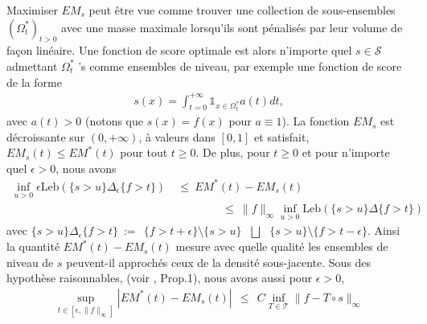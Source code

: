 \documentclass[a4paper, 12pt]{article}
\def\S{\mathcal{S}}
\def\leb{\text{Leb}}
\begin{document}
%
\begin{center}
\label{resume_fr:EMcurve}
\end{center}
%
\noindent
Maximiser $ EM_s $ peut être vue comme trouver une collection de sous-ensembles $ (\Omega ^ * _ t) _ {t> 0} $ avec une masse maximale lorsqu'ils sont pénalisés par leur volume de façon linéaire. Une fonction de score optimale est alors n'importe quel $ s \in \S $ admettant $ \Omega^*_t $ 's comme ensembles de niveau, par exemple une fonction de score de la forme
\begin{align*}
s(x)=\int_{t=0}^{+\infty} \mathds{1}_{x\in \Omega^*_t}a(t)dt,\end{align*}
avec $a(t)>0$ (notons que $s(x)=f(x)$ pour $a \equiv 1$).
%
La fonction $EM_s$ est décroissante sur $(0,+\infty)$, à valeurs dans $[0,1]$ et satisfait, $EM_s(t) \le EM^*(t)$ pour tout $t\geq 0$. 
De plus, pour $t \ge 0$ et pour n'importe quel $\epsilon > 0$, nous avons 
\begin{align*}
\inf_{u>0} \epsilon \leb (\{ s >u\}\Delta_\epsilon \{f>t\}) &~\le~ EM^*(t)-EM_s(t) \\ &~~~~~~~~~~~~~~~~~~~\le~ \|f\|_\infty \inf_{u>0} \leb (\{ s >u\}\Delta\{f>t\})
\end{align*}
avec $\{ s >u\}\Delta_\epsilon \{f>t\} ~:=~~ \{f>t+\epsilon\} \setminus \{ s >u\} ~~~\bigsqcup~~~ \{ s >u\} \setminus \{f>t-\epsilon\}$. Ainsi la quantité $EM^*(t)-EM_s(t)$ mesure avec quelle qualité les ensembles de niveau de $s$ peuvent-il approchés ceux de la densité sous-jacente.
Sous des hypothèse raisonnables, (voir \cite{AISTAT15}, Prop.1), nous avons aussi pour $\epsilon >0$, 
\begin{align*}
\sup_{t\in[\epsilon ,\|f\|_\infty]}|EM^*(t)-EM_s(t)| ~~\le~~  C \inf_{T  \in \mathcal{T}} \|f-T\circ s\|_\infty
\end{align*}
\end{document}
